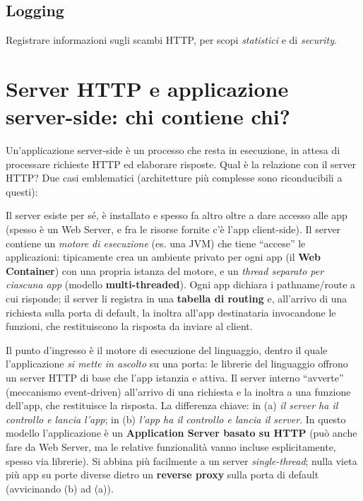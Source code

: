 \subsection{Logging}
Registrare informazioni sugli scambi HTTP, per scopi \emph{statistici} e di \emph{security}.

\section{Server HTTP e applicazione server-side: chi contiene chi?}

Un'applicazione server-side \`e un processo che resta in esecuzione, in attesa di processare
richieste HTTP ed elaborare risposte. Qual \`e la relazione con il server HTTP? Due casi
emblematici (architetture pi\`u complesse sono riconducibili a questi):

\begin{importante}
Il server esiste per s\'e, \`e installato e spesso fa altro oltre a dare accesso alle app
(spesso \`e un Web Server, e fra le risorse fornite c'\`e l'app client-side). Il server
contiene un \emph{motore di esecuzione} (es. una JVM) che tiene ``accese'' le applicazioni:
tipicamente crea un ambiente privato per ogni app (il \textbf{Web Container}) con una propria
istanza del motore, e un \emph{thread separato per ciascuna app} (modello
\textbf{multi-threaded}). Ogni app dichiara i pathname/route a cui risponde; il server li
registra in una \textbf{tabella di routing} e, all'arrivo di una richiesta sulla porta di
default, la inoltra all'app destinataria invocandone le funzioni, che restituiscono la
risposta da inviare al client.
\end{importante}

\begin{importante}
Il punto d'ingresso \`e il motore di esecuzione del linguaggio, dentro il quale
l'applicazione \emph{si mette in ascolto} su una porta: le librerie del linguaggio offrono un
server HTTP di base che l'app istanzia e attiva. Il server interno ``avverte'' (meccanismo
event-driven) all'arrivo di una richiesta e la inoltra a una funzione dell'app, che
restituisce la risposta. La differenza chiave: in (a) \emph{il server ha il controllo e
lancia l'app}; in (b) \emph{l'app ha il controllo e lancia il server}. In questo modello
l'applicazione \`e un \textbf{Application Server basato su HTTP} (pu\`o anche fare da Web
Server, ma le relative funzionalit\`a vanno incluse esplicitamente, spesso via librerie). Si
abbina pi\`u facilmente a un server \emph{single-thread}; nulla vieta pi\`u app su porte
diverse dietro un \textbf{reverse proxy} sulla porta di default (avvicinando (b) ad (a)).
\end{importante}

